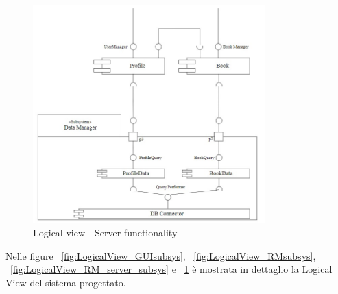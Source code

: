 \begin{figure}[h!]
	\centering
	\includegraphics[width=0.8\textwidth]{Immagini/Server_subsys}
	\caption{Logical view - Server functionality}
	\label{fig:LogicalView_ServerSubsys}
\end{figure}
\noindent
Nelle figure ~\ref{fig:LogicalView_GUIsubsys}, ~\ref{fig:LogicalView_RMsubsys}, ~\ref{fig:LogicalView_RM_server_subsys} e ~\ref{fig:LogicalView_ServerSubsys} è mostrata in dettaglio la Logical View del sistema progettato. 

